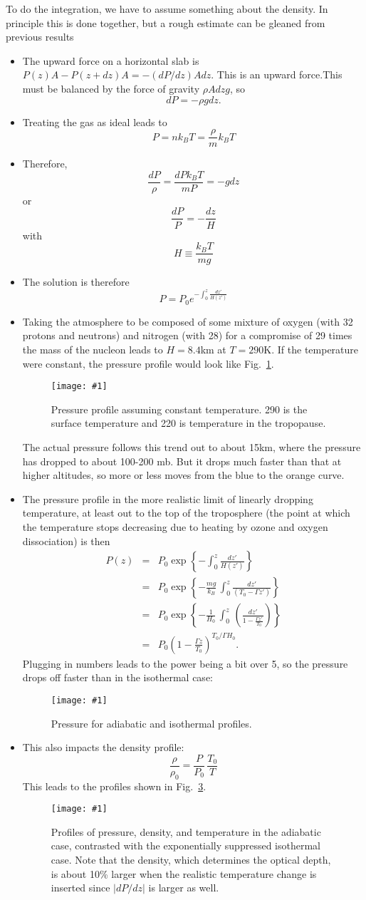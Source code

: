 \documentclass[11pt]{book}
\def\be{\begin{equation}}
\def\ee{\end{equation}}
\def\bea{\begin{eqnarray}}
\def\eea{\end{eqnarray}}
\newcommand{\vs}{\nonumber\\}
\newcommand{\sfig}[2]{
\texttt{[image: \#1]}
        }
\newcommand{\Sfig}[2]{
   \begin{figure}[thbp]
   \begin{center}
    \sfig{../Figures/#1.pdf}{0.7\columnwidth}
    \caption{{\small #2}}
    \label{fig:#1}
     \end{center}
   \end{figure}
}
\newcommand{\Spng}[2]{
   \begin{figure}[thbp]
   \begin{center}
    \sfig{../Figures/#1.png}{0.7\columnwidth}
    \caption{{\small #2}}
    \label{fig:#1}
     \end{center}
   \end{figure}
}
\newcommand{\rf}[1]{\ref{fig:#1}}
\newcommand\bei{\begin{itemize}}
\newcommand\eei{\end{itemize}}
\begin{document}
To do the integration, we have to assume something about the density. In principle this is done together, but a rough estimate can be gleaned from previous results
\bei
\item The upward force on a horizontal slab is $P(z)A-P(z+dz)A=-(dP/dz)A dz$. This is an upward force.This must be balanced by the force of gravity $\rho Adz g$, so
\be
dP = -\rho g dz.
\ee
\item Treating the gas as ideal leads to
\be
P=nk_BT=\frac{\rho}{m} k_BT\ee
\item Therefore,
\be
\frac{dP}{\rho} = \frac{dP k_BT}{mP} = -gdz\ee
or\be
\frac{dP}{P} = -\frac{dz}{H}
\ee
with \be
H\equiv \frac{k_BT}{mg}\ee
\item The solution is therefore
\be
P=P_0e^{-\int_0^z \frac{dz'}{H(z')}}
\ee
\item Taking the atmosphere to be composed of some mixture of oxygen (with 32 protons and neutrons) and nitrogen (with 28) for a compromise of 29 times the mass of the nucleon leads to $H=8.4$km at $T=290$K. If the temperature were constant, the pressure profile would look like Fig.~\rf{pressure}.
\Sfig{pressure}{Pressure profile assuming constant temperature. 290 is the surface temperature and 220 is temperature in the tropopause.}
The actual pressure follows this trend out to about 15km, where the pressure has dropped to about 100-200 mb. But it drops much faster than that at higher altitudes, so more or less moves from the blue to the orange curve.
\item The pressure profile in the more realistic limit of linearly dropping temperature, at least out to the top of the troposphere (the point at which the temperature stops decreasing due to heating by ozone and oxygen dissociation) is then
\bea
P(z) &=& P_0 \exp\left\{ -\int_0^z \frac{dz'}{H(z')} \right\}
\vs
&=&P_0 \exp\left\{ -\frac{mg}{k_B}\,\int_0^z \frac{dz'}{ (T_0-\Gamma z')} \right\}\vs
&=&
P_0 \exp\left\{ -\frac{1}{H_0}\,\int _0^z\,\left( \frac{dz'}{1- \frac{\Gamma z'}{T_0}}\right)\right\}
\vs
&=& P_0 \left(1 -  \frac{\Gamma z}{T_0}\right)^{T_0/\Gamma H_0}.
\eea
Plugging in numbers leads to the power being a bit over 5, so the pressure drops off faster than in the isothermal case:
\Spng{pisoad}{Pressure for adiabatic and isothermal profiles.}
\item This also impacts the density profile:
\be
\frac{\rho}{\rho_0} = \frac{P}{P_0}\,\frac{T_0}{T}\ee
This leads to the profiles shown in Fig.~\rf{isoad}.
\Spng{isoad}{Profiles of pressure, density, and temperature in the adiabatic case, contrasted with the exponentially suppressed isothermal case. Note that the density, which determines the optical depth, is about 10\% larger when the realistic temperature change is inserted since $|dP/dz|$ is larger as well.}
\eei
\end{document}
